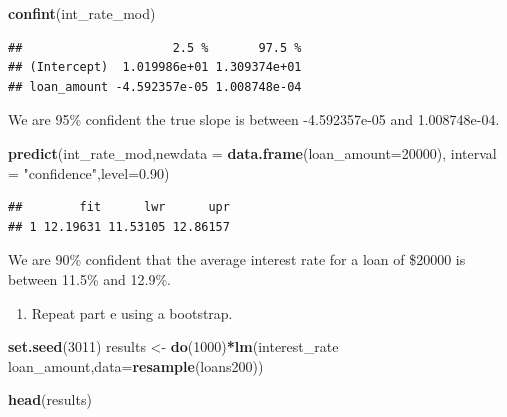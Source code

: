 \documentclass[
]{book}
\newenvironment{Shaded}{\begin{snugshade}}{\end{snugshade}}
\newcommand{\DataTypeTok}[1]{\textcolor[rgb]{0.13,0.29,0.53}{#1}}
\newcommand{\DecValTok}[1]{\textcolor[rgb]{0.00,0.00,0.81}{#1}}
\newcommand{\FloatTok}[1]{\textcolor[rgb]{0.00,0.00,0.81}{#1}}
\newcommand{\KeywordTok}[1]{\textcolor[rgb]{0.13,0.29,0.53}{\textbf{#1}}}
\newcommand{\NormalTok}[1]{#1}
\newcommand{\OperatorTok}[1]{\textcolor[rgb]{0.81,0.36,0.00}{\textbf{#1}}}
\newcommand{\StringTok}[1]{\textcolor[rgb]{0.31,0.60,0.02}{#1}}
\providecommand{\tightlist}{%
  \setlength{\itemsep}{0pt}\setlength{\parskip}{0pt}}
\begin{document}
\begin{Shaded}
\begin{Highlighting}[]
\KeywordTok{confint}\NormalTok{(int_rate_mod)}
\end{Highlighting}
\end{Shaded}

\begin{verbatim}
##                     2.5 %       97.5 %
## (Intercept)  1.019986e+01 1.309374e+01
## loan_amount -4.592357e-05 1.008748e-04
\end{verbatim}

We are 95\% confident the true slope is between -4.592357e-05 and 1.008748e-04.

\begin{Shaded}
\begin{Highlighting}[]
\KeywordTok{predict}\NormalTok{(int_rate_mod,}\DataTypeTok{newdata =} \KeywordTok{data.frame}\NormalTok{(}\DataTypeTok{loan_amount=}\DecValTok{20000}\NormalTok{),}
        \DataTypeTok{interval =} \StringTok{"confidence"}\NormalTok{,}\DataTypeTok{level=}\FloatTok{0.90}\NormalTok{)}
\end{Highlighting}
\end{Shaded}

\begin{verbatim}
##        fit      lwr      upr
## 1 12.19631 11.53105 12.86157
\end{verbatim}

We are 90\% confident that the average interest rate for a loan of \$20000 is between 11.5\% and 12.9\%.

\begin{enumerate}
\def\labelenumi{\alph{enumi}.}
\setcounter{enumi}{5}
\tightlist
\item
  Repeat part e using a bootstrap.
\end{enumerate}

\begin{Shaded}
\begin{Highlighting}[]
\KeywordTok{set.seed}\NormalTok{(}\DecValTok{3011}\NormalTok{)}
\NormalTok{results <-}\StringTok{ }\KeywordTok{do}\NormalTok{(}\DecValTok{1000}\NormalTok{)}\OperatorTok{*}\KeywordTok{lm}\NormalTok{(interest_rate }\OperatorTok{~}\StringTok{ }\NormalTok{loan_amount,}\DataTypeTok{data=}\KeywordTok{resample}\NormalTok{(loans200))}
\end{Highlighting}
\end{Shaded}

\begin{Shaded}
\begin{Highlighting}[]
\KeywordTok{head}\NormalTok{(results)}
\end{Highlighting}
\end{Shaded}
\end{document}
